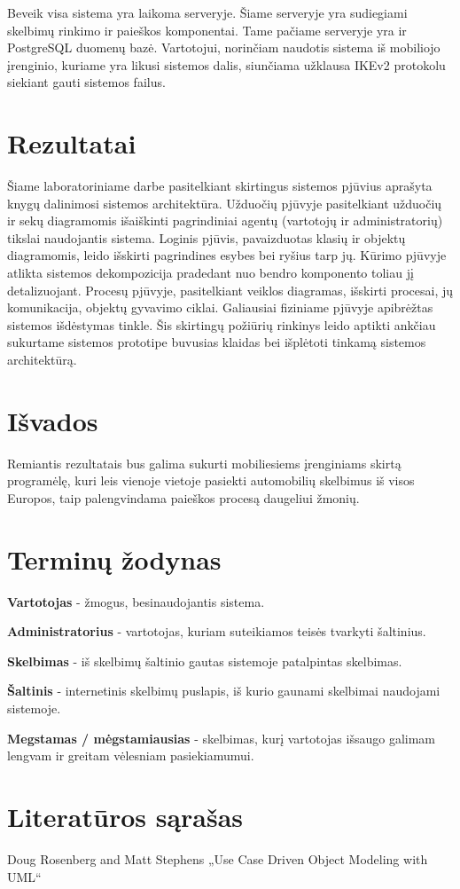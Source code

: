 \documentclass[12pt]{article}
\begin{document}
	Beveik visa sistema yra laikoma serveryje. Šiame serveryje yra sudiegiami skelbimų rinkimo ir paieškos komponentai. Tame pačiame serveryje yra ir PostgreSQL duomenų bazė. Vartotojui, norinčiam naudotis sistema iš mobiliojo įrenginio, kuriame yra likusi sistemos dalis, siunčiama užklausa IKEv2 protokolu siekiant gauti sistemos failus.
	\pagebreak
	
	\section*{Rezultatai}
	Šiame laboratoriniame darbe pasitelkiant skirtingus sistemos pjūvius aprašyta knygų dalinimosi sistemos architektūra. Užduočių pjūvyje pasitelkiant užduočių ir sekų diagramomis išaiškinti pagrindiniai agentų (vartotojų ir administratorių) tikslai naudojantis sistema. Loginis pjūvis, pavaizduotas klasių ir objektų diagramomis, leido išskirti pagrindines esybes bei ryšius tarp jų. Kūrimo pjūvyje atlikta sistemos dekompozicija pradedant nuo bendro komponento toliau jį detalizuojant. Procesų pjūvyje, pasitelkiant veiklos diagramas, išskirti procesai, jų komunikacija, objektų gyvavimo ciklai. Galiausiai fiziniame pjūvyje apibrėžtas sistemos išdėstymas tinkle. Šis skirtingų požiūrių rinkinys leido aptikti ankčiau sukurtame sistemos prototipe buvusias klaidas bei išplėtoti tinkamą sistemos architektūrą.
	\pagebreak

	\section*{Išvados}
	Remiantis rezultatais bus galima sukurti mobiliesiems įrenginiams skirtą programėlę, kuri leis vienoje vietoje pasiekti automobilių skelbimus iš visos Europos, taip palengvindama paieškos procesą daugeliui žmonių. 
	\pagebreak

	\section*{Terminų žodynas}
	
	\bigskip
	\textbf{Vartotojas} - žmogus, besinaudojantis sistema.
	
	\textbf{Administratorius} - vartotojas, kuriam suteikiamos teisės tvarkyti šaltinius.
	
	\textbf{Skelbimas} - iš skelbimų šaltinio gautas sistemoje patalpintas skelbimas.
	
	\textbf{Šaltinis} - internetinis skelbimų puslapis, iš kurio gaunami skelbimai naudojami sistemoje.
	
	\textbf{Megstamas / mėgstamiausias} - skelbimas, kurį vartotojas išsaugo galimam lengvam ir greitam vėlesniam pasiekiamumui.
	\pagebreak

	\section*{Literatūros sąrašas}
	
	Doug Rosenberg and Matt Stephens „Use Case Driven Object Modeling with UML“
\end{document}
